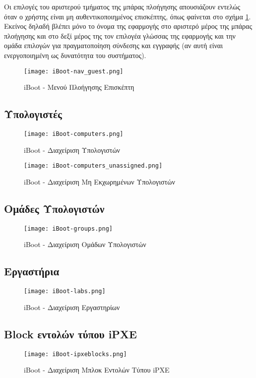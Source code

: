 Οι επιλογές του αριστερού τμήματος της μπάρας πλοήγησης απουσιάζουν εντελώς όταν ο χρήστης είναι μη αυθεντικοποιημένος επισκέπτης, όπως φαίνεται στο σχήμα \ref{fig:iBoot_nav_guest}. Εκείνος δηλαδή βλέπει μόνο το όνομα της εφαρμογής στο αριστερό μέρος της μπάρας πλοήγησης και στο δεξί μέρος της τον επιλογέα γλώσσας της εφαρμογής και την ομάδα επιλογών για πραγματοποίηση σύνδεσης και εγγραφής (αν αυτή είναι ενεργοποιημένη ως δυνατότητα του συστήματος).
\begin{figure}[ht]
	\centering
	\texttt{[image: iBoot-nav\_guest.png]}
	\caption{iBoot - Μενού Πλοήγησης Επισκέπτη}
	\label{fig:iBoot_nav_guest}
\end{figure}
\FloatBarrier

\subsection{Υπολογιστές}
\FloatBarrier
\begin{figure}[ht]
	\centering
	\texttt{[image: iBoot-computers.png]}
	\caption{iBoot - Διαχείριση Υπολογιστών}
	\label{fig:iBoot_computers}
\end{figure}

\begin{figure}[ht]
	\centering
	\texttt{[image: iBoot-computers\_unassigned.png]}
	\caption{iBoot - Διαχείριση Μη Εκχωρημένων Υπολογιστών}
	\label{fig:iBoot_computers_unassigned}
\end{figure}
\FloatBarrier

\subsection{Ομάδες Υπολογιστών}
\FloatBarrier
\begin{figure}[ht]
	\centering
	\texttt{[image: iBoot-groups.png]}
	\caption{iBoot - Διαχείριση Ομάδων Υπολογιστών}
	\label{fig:iBoot_groups}
\end{figure}
\FloatBarrier

\subsection{Εργαστήρια}
\FloatBarrier
\begin{figure}[ht]
	\centering
	\texttt{[image: iBoot-labs.png]}
	\caption{iBoot - Διαχείριση Εργαστηρίων}
	\label{fig:iBoot_labs}
\end{figure}
\FloatBarrier

\subsection{Block εντολών τύπου iPXE}
\FloatBarrier
\begin{figure}[ht]
	\centering
	\texttt{[image: iBoot-ipxeblocks.png]}
	\caption{iBoot - Διαχείριση Μπλοκ Εντολών Τύπου iPXE}
	\label{fig:iBoot_ipxeblocks}
\end{figure}
\FloatBarrier

